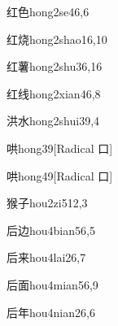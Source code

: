 \begin{verbete}{红色}{hong2se4}{6,6}
\end{verbete}

\begin{verbete}{红烧}{hong2shao1}{6,10}
\end{verbete}

\begin{verbete}{红薯}{hong2shu3}{6,16}
\end{verbete}

\begin{verbete}{红线}{hong2xian4}{6,8}
\end{verbete}

\begin{verbete}{洪水}{hong2shui3}{9,4}
\end{verbete}

\begin{verbete}{哄}{hong3}{9}[Radical 口]
\end{verbete}

\begin{verbete}{哄}{hong4}{9}[Radical 口]
\end{verbete}

\begin{verbete}{猴子}{hou2zi5}{12,3}
\end{verbete}

\begin{verbete}{后边}{hou4bian5}{6,5}
\end{verbete}

\begin{verbete}{后来}{hou4lai2}{6,7}
\end{verbete}

\begin{verbete}{后面}{hou4mian5}{6,9}
\end{verbete}

\begin{verbete}{后年}{hou4nian2}{6,6}
\end{verbete}

